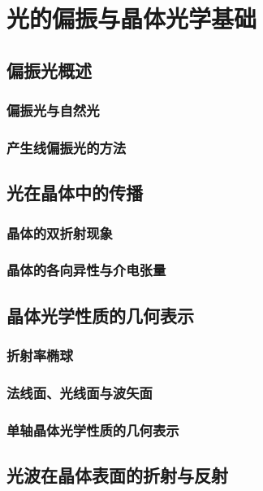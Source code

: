 \documentclass[cn,10pt,chinesefont=founder,math=mtpro2,cite=super,toc=onecol,twoside]{elegantbook}
\begin{document}
\chapter{光的偏振与晶体光学基础}

\section{偏振光概述}

\subsection{偏振光与自然光}

\subsection{产生线偏振光的方法}

\section{光在晶体中的传播}

\subsection{晶体的双折射现象}

\subsection{晶体的各向异性与介电张量}

\section{晶体光学性质的几何表示}

\subsection{折射率椭球}

\subsection{法线面、光线面与波矢面}

\subsection{单轴晶体光学性质的几何表示}

\section{光波在晶体表面的折射与反射}
\end{document}
